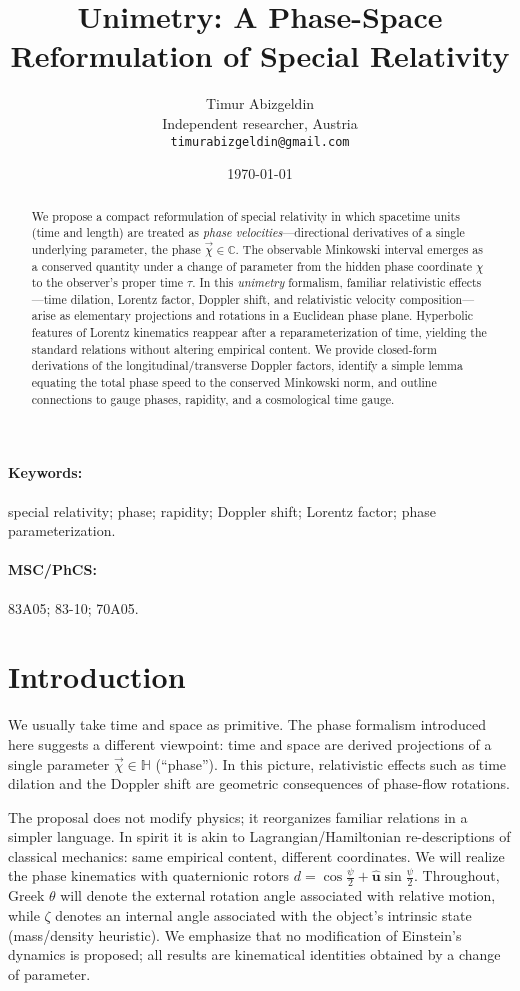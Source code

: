 \documentclass[11pt]{article}
\title{Unimetry: A Phase-Space Reformulation of Special Relativity}
\author{Timur Abizgeldin\\ \small Independent researcher, Austria\\ \small \texttt{timurabizgeldin@gmail.com}}
\date{\today}
\numberwithin{equation}{section}
\begin{document}
\maketitle

\begin{abstract}
We propose a compact reformulation of special relativity in which spacetime units (time and length) are treated as \emph{phase velocities}---directional derivatives of a single underlying parameter, the phase $\vec{\chi}\in\mathbb{C}$. The observable Minkowski interval emerges as a conserved quantity under a change of parameter from the hidden phase coordinate $\chi$ to the observer's proper time $\tau$. In this \emph{unimetry} formalism, familiar relativistic effects---time dilation, Lorentz factor, Doppler shift, and relativistic velocity composition---arise as elementary projections and rotations in a Euclidean phase plane. Hyperbolic features of Lorentz kinematics reappear after a reparameterization of time, yielding the standard relations without altering empirical content. We provide closed-form derivations of the longitudinal/transverse Doppler factors, identify a simple lemma equating the total phase speed to the conserved Minkowski norm, and outline connections to gauge phases, rapidity, and a cosmological time gauge.
\end{abstract}

\paragraph{Keywords:} special relativity; phase; rapidity; Doppler shift; Lorentz factor; phase parameterization.

\paragraph{MSC/PhCS:} 83A05; 83-10; 70A05.


\section{Introduction}

We usually take time and space as primitive. The phase formalism introduced here suggests a
different viewpoint: time and space are derived projections of a single parameter $\vec{\chi}\in\mathbb{H}$ (``phase'').
In this picture, relativistic effects such as time dilation and the Doppler shift are geometric
consequences of phase-flow rotations.

The proposal does not modify physics; it reorganizes familiar relations in a simpler language.
In spirit it is akin to Lagrangian/Hamiltonian re-descriptions of classical mechanics: same
empirical content, different coordinates. We will realize the phase kinematics with quaternionic rotors \(d=\cos\tfrac{\psi}{2}+\hat{\mathbf u}\sin\tfrac{\psi}{2}\). Throughout, Greek $\theta$ will denote the external rotation
angle associated with relative motion, while $\zeta$ denotes an internal angle associated with the
object's intrinsic state (mass/density heuristic). We emphasize that no modification of Einstein's
dynamics is proposed; all results are kinematical identities obtained by a change of parameter.
\end{document}
